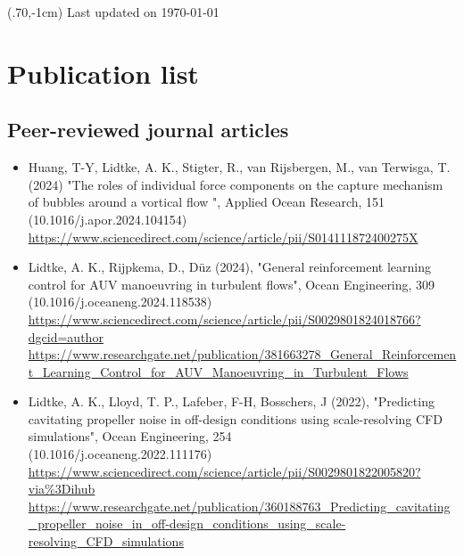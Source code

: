 \documentclass[a4paper,10pt]{article}
\begin{document}
\pagestyle{empty} %

\begin{textblock*}{100mm}(.70\textwidth,-1cm)
Last updated on \today
\end{textblock*}

\section{Publication list}

\subsection{Peer-reviewed journal articles}
%
\begin{itemize}
%
\item Huang, T-Y, Lidtke, A. K., Stigter, R., van Rijsbergen, M., van Terwisga, T. (2024)
	 "The roles of individual force components on the capture mechanism of bubbles around a vortical flow ",
	 Applied Ocean Research, 151
	\cite{huang_roles_2024}
	\\(10.1016/j.apor.2024.104154)
	\\ \url{https://www.sciencedirect.com/science/article/pii/S014111872400275X}
%
\item Lidtke, A. K., Rijpkema, D., D{\"u}z (2024),
    "General reinforcement learning control for AUV manoeuvring in turbulent flows",
    Ocean Engineering, 309
    \cite{lidtke_general_2024}
    \\ (10.1016/j.oceaneng.2024.118538)
    \\ \url{https://www.sciencedirect.com/science/article/pii/S0029801824018766?dgcid=author}
    \\ \url{https://www.researchgate.net/publication/381663278_General_Reinforcement_Learning_Control_for_AUV_Manoeuvring_in_Turbulent_Flows}
%
\item Lidtke, A. K., Lloyd, T. P., Lafeber, F-H, Bosschers, J (2022),
    "Predicting cavitating propeller noise in off-design conditions using scale-resolving CFD simulations",
    Ocean Engineering, 254
    \cite{lidtke_predicting_2022}
    \\ (10.1016/j.oceaneng.2022.111176)
    \\ \url{https://www.sciencedirect.com/science/article/pii/S0029801822005820?via\%3Dihub}
    \\ \url{https://www.researchgate.net/publication/360188763_Predicting_cavitating_propeller_noise_in_off-design_conditions_using_scale-resolving_CFD_simulations}

\end{itemize}
\end{document}
